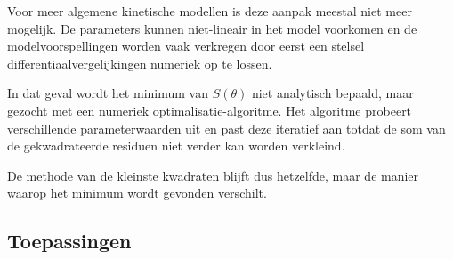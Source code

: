 \documentclass{ximera}
\begin{document}
Voor meer algemene kinetische modellen is deze aanpak meestal niet meer
mogelijk. De parameters kunnen niet-lineair in het model voorkomen en de
modelvoorspellingen worden vaak verkregen door eerst een stelsel
differentiaalvergelijkingen numeriek op te lossen.

In dat geval wordt het minimum van $S(\theta)$ niet analytisch bepaald, maar
gezocht met een numeriek optimalisatie-algoritme. Het algoritme probeert
verschillende parameterwaarden uit en past deze iteratief aan totdat de som van
de gekwadrateerde residuen niet verder kan worden verkleind.

De methode van de kleinste kwadraten blijft dus hetzelfde, maar de manier waarop
het minimum wordt gevonden verschilt.

\subsection*{Toepassingen}
\end{document}
